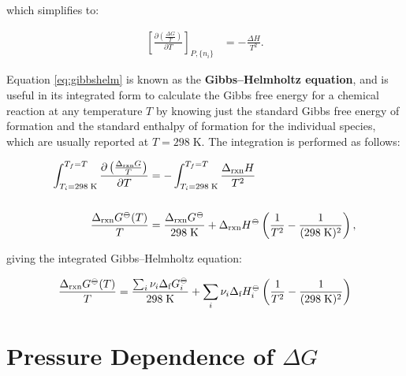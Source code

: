 \documentclass[
  9pt,
]{extbook}
\theoremstyle{definition}
\theoremstyle{definition}
\theoremstyle{definition}
\theoremstyle{remark}
\begin{document}
which simplifies to:

\begin{equation}
\begin{aligned}
\left[ \frac{\partial\left( \frac{\Delta G}{T} \right)}{\partial T} \right]_{P,\{n_i\}} &= - \frac{\Delta H}{T^2}.
\end{aligned}
\label{eq:gibbshelm}
\end{equation}

Equation \eqref{eq:gibbshelm} is known as the \textbf{Gibbs--Helmholtz equation}, and is useful in its integrated form to calculate the Gibbs free energy for a chemical reaction at any temperature \(T\) by knowing just the standard Gibbs free energy of formation and the standard enthalpy of formation for the individual species, which are usually reported at \(T=298\;\text{K}\). The integration is performed as follows:

\begin{equation}
\begin{aligned}
\int_{T_i=298 \;\text{K}}^{T_f=T}  \frac{\partial\left( \frac{\Delta_{\text{rxn}} G}{T} \right)}{\partial T} &=  - \int_{T_i=298 \;\text{K}}^{T_f=T}  \frac{\Delta_{\text{rxn}} H}{T^2} \\ \\ \frac{\Delta_{\text{rxn}} G^{-\kern-6pt{\ominus}\kern-6pt-}(T)}{T} &=  \frac{\Delta_{\text{rxn}} G^{-\kern-6pt{\ominus}\kern-6pt-}}{298 \;\text{K}} + \Delta_{\text{rxn}} H^{-\kern-6pt{\ominus}\kern-6pt-}\left( \frac{1}{T^2} -\frac{1}{(298 \;\text{K})^2} \right),
\end{aligned}
\label{eq:gibbshelmIbase}
\end{equation}

giving the integrated Gibbs--Helmholtz equation:

\begin{equation}
\frac{\Delta_{\text{rxn}} G^{-\kern-6pt{\ominus}\kern-6pt-}(T)}{T} =  \frac{\sum_i \nu_i \Delta_{\text{f}} G_i^{-\kern-6pt{\ominus}\kern-6pt-}}{298 \;\text{K}} + \sum_i \nu_i \Delta_{\text{f}} H_i^{-\kern-6pt{\ominus}\kern-6pt-}\left( \frac{1}{T^2} -\frac{1}{(298 \;\text{K})^2} \right)
\label{eq:gibbshelmI}
\end{equation}

\hypertarget{pressure-dependence-of-delta-g}{%
\section{\texorpdfstring{Pressure Dependence of \(\Delta G\)}{Pressure Dependence of \textbackslash Delta G}}\label{pressure-dependence-of-delta-g}}
\end{document}
